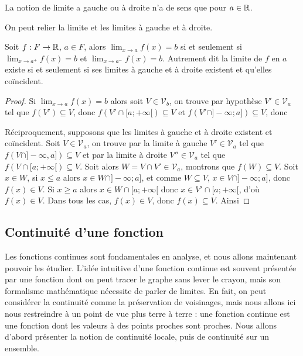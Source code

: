 \begin{rmk}
    La notion de limite a gauche ou à droite n'a de sens que pour $a\in\mathbb{R}$.
\end{rmk}

On peut relier la limite et les limites à gauche et à droite.

\begin{prop}
    Soit $f : F \to\mathbb{R}$, $a\in F$, alors $\displaystyle{\lim_{x\to a} f(x) = b}$ si et seulement si $\displaystyle{\lim_{x\to a^+} f(x) = b}$ et $\displaystyle{\lim_{x\to a^-} f(x) = b}$. Autrement dit la limite de $f$ en $a$ existe si et seulement si ses limites à gauche et à droite existent et qu'elles coïncident.
\end{prop}

\begin{proof}
    Si $\displaystyle{\lim_{x\to a}f(x)=b}$ alors soit $V\in\mathcal V_b$, on trouve par hypothèse $V'\in\mathcal V_a$ tel que $f(V')\subseteq V$, donc $f(V'\cap [a;+\infty[)\subseteq V$ et $f(V'\cap ]-\infty;a])\subseteq V$, donc 

    Réciproquement, supposons que les limites à gauche et à droite existent et coïncident. Soit $V\in\mathcal V_a$, on trouve par la limite à gauche $V'\in\mathcal V_a$ tel que $f(V\cap ]-\infty,a])\subseteq V$ et par la limite à droite $V''\in\mathcal V_a$ tel que $f(V\cap [a;+\infty[)\subseteq V$. Soit alors $W = V\cap V' \in\mathcal V_a$, montrons que $f(W)\subseteq V$. Soit $x\in W$, si $x\leq a$ alors $x\in W\cap ]-\infty;a]$, et comme $W\subseteq V$, $x\in V\cap ]-\infty;a]$, donc $f(x) \in V$. Si $x \geq a$ alors $x\in W \cap [a;+\infty[$ donc $x\in V'\cap[a;+\infty[$, d'où $f(x)\in V$. Dans tous les cas, $f(x)\in V$, donc $f(x)\subseteq V$. Ainsi 
\end{proof}

\subsection{Continuité d'une fonction}

Les fonctions continues sont fondamentales en analyse, et nous allons maintenant pouvoir les étudier. L'idée intuitive d'une fonction continue est souvent présentée par \og une fonction dont on peut tracer le graphe sans lever le crayon\fg{}, mais son formalisme mathématique nécessite de parler de limites. En fait, on peut considérer la continuité comme la préservation de voisinages, mais nous allons ici nous restreindre à un point de vue plus terre à terre : une fonction continue est une fonction dont les valeurs à des points proches sont proches. Nous allons d'abord présenter la notion de continuité locale, puis de continuité sur un ensemble.

